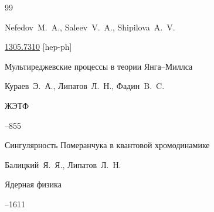 \begin{thebibliography}{99}


\by Nefedov~M.~A.,  Saleev~V.~A., Shipilova~A.~V.



\arxiv \href{http://arxiv.org/abs/1305.7310}{1305.7310} [hep-ph]




\paper Мультиреджевские процессы в теории Янга–Миллса

\by Кураев~Э.~А., Липатов~Л.~Н., Фадин~B.~C.

\jour ЖЭТФ



--855
















\paper Сингулярность Померанчука в квантовой хромодинамике

\by Балицкий~Я.~Я., Липатов~Л.~Н.

\jour Ядерная физика



--1611










\end{thebibliography}

